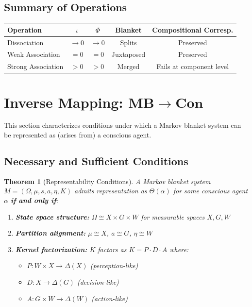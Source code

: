 \documentclass[11pt,a4paper]{article}
\theoremstyle{definition}
\theoremstyle{plain}
\newtheorem{theorem}[definition]{Theorem}
\theoremstyle{remark}
\newcommand{\Con}{\mathbf{Con}}
\newcommand{\MB}{\mathbf{MB}}
\newcommand{\ProbSpace}[1]{\Delta(#1)}
\begin{document}
\subsection{Summary of Operations}

\begin{center}
\begin{tabular}{lcccc}
\toprule
\textbf{Operation} & $\iota$ & $\Phi$ & \textbf{Blanket} & \textbf{Compositional Corresp.} \\
\midrule
Dissociation & $\to 0$ & $\to 0$ & Splits & Preserved \\
Weak Association & $= 0$ & $= 0$ & Juxtaposed & Preserved \\
Strong Association & $> 0$ & $> 0$ & Merged & Fails at component level \\
\bottomrule
\end{tabular}
\end{center}

\section{Inverse Mapping: $\MB \to \Con$}\label{sec:inverse}

This section characterizes conditions under which a Markov blanket system can be represented as (arises from) a conscious agent.

\subsection{Necessary and Sufficient Conditions}

\begin{theorem}[Representability Conditions]\label{thm:representability}
A Markov blanket system $M = (\Omega, \mu, s, a, \eta, K)$ admits representation as $\Theta(\alpha)$ for some conscious agent $\alpha$ \textbf{if and only if}:
\begin{enumerate}[label=(\roman*)]
    \item \textbf{State space structure:} $\Omega \cong X \times G \times W$ for measurable spaces $X, G, W$
    \item \textbf{Partition alignment:} $\mu \cong X$, $a \cong G$, $\eta \cong W$
    \item \textbf{Kernel factorization:} $K$ factors as $K = P \cdot D \cdot A$ where:
    \begin{itemize}
        \item $P: W \times X \to \ProbSpace{X}$ (perception-like)
        \item $D: X \to \ProbSpace{G}$ (decision-like)
        \item $A: G \times W \to \ProbSpace{W}$ (action-like)
    \end{itemize}
\end{enumerate}
\end{theorem}
\end{document}
